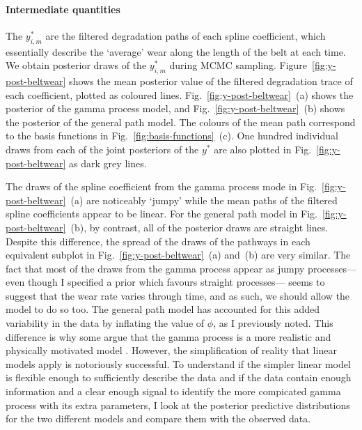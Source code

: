 \paragraph{Intermediate quantities}
The $y^*_{i, m}$ are the filtered degradation paths of each spline coefficient, which essentially describe the `average' wear along the length of the belt at each time. We obtain posterior draws of the $y^*_{i, m}$ during MCMC sampling. Figure~\ref{fig:y-post-beltwear} shows the mean posterior value of the filtered degradation trace of each coefficient, plotted as coloured lines. Fig.~\ref{fig:y-post-beltwear}~(a) shows the posterior of the gamma process model, and Fig.~\ref{fig:y-post-beltwear}~(b) shows the posterior of the general path model. The colours of the mean path correspond to the basis functions in Fig.~\ref{fig:basis-functions}~(c). One hundred individual draws from each of the joint posteriors of the $y^*$ are also plotted in Fig.~\ref{fig:y-post-beltwear} as dark grey lines.

The draws of the spline coefficient from the gamma process mode in Fig.~\ref{fig:y-post-beltwear}~(a) are noticeably `jumpy' while the mean paths of the filtered spline coefficients appear to be linear. For the general path model in Fig.~\ref{fig:y-post-beltwear}~(b), by contrast, all of the posterior draws are straight lines. Despite this difference, the spread of the draws of the pathways in each equivalent subplot in Fig.~\ref{fig:y-post-beltwear}~(a) and~(b) are very similar. The fact that most of the draws from the gamma process appear as jumpy processes---even though I specified a prior which favours straight processes--- seems to suggest that the wear rate varies through time, and as such, we should allow the model to do so too. The general path model has accounted for this added variability in the data by inflating the value of $\phi$, as I previously noted. This difference is why some argue that the gamma process is a more realistic and physically motivated model \citep{ye2015}. However, the simplification of reality that linear models apply is notoriously successful. To understand if the simpler linear model is flexible enough to sufficiently describe the data and if the data contain enough information and a clear enough signal to identify the more compicated gamma process with its extra parameters, I look at the posterior predictive distributions for the two different models and compare them with the observed data.

